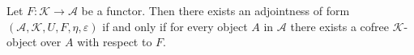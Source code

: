 Let $F: \mathcal{K} \longrightarrow \mathcal{A}$ be a functor. Then there exists an adjointness of form $(\mathcal{A}, \mathcal{K}, U, F, \eta, \varepsilon)$ if and only if for every object $A$ in $\mathcal{A}$ there exists a cofree $\mathcal{K}$-object over $A$ with respect to $F$.
